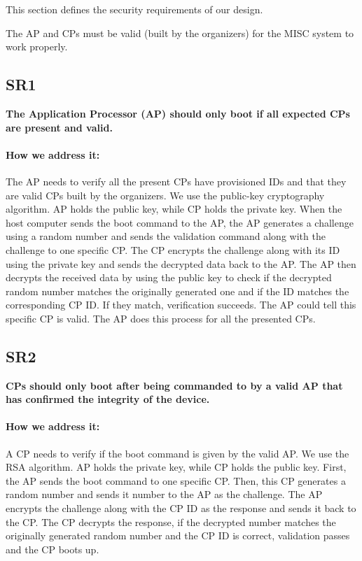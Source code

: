 \documentclass[11pt,oneside,onecolumn,letterpaper]{article}
\newcounter{alg}
\begin{document}
	This section defines the security requirements of our design.
	
	The AP and CPs must be valid (built by the organizers) for the MISC system to work properly.
	
	\subsection{SR1}
	\textbf{The Application Processor (AP) should only boot if all expected CPs are present and valid.}
	\paragraph{How we address it:}
	The AP needs to verify all the present CPs have provisioned IDs and that they are valid CPs built by the organizers.
	We use the public-key cryptography algorithm.
	AP holds the public key,
	while CP holds the private key.
	When the host computer sends the boot command to the AP,
	the AP generates a challenge using a random number and sends the validation command along with the challenge to one specific CP.
	The CP encrypts the challenge along with its ID using the private key and sends the decrypted data back to the AP.
	The AP then decrypts the received data by using the public key to check if the decrypted random number matches the originally generated one and if the ID matches the corresponding CP ID.
	If they match,
	verification succeeds.
	The AP could tell this specific CP is valid.
	The AP does this process for all the presented CPs.
	
	\subsection{SR2}
	\textbf{CPs should only boot after being commanded to by a valid AP that has confirmed the integrity of the device.}
	\paragraph{How we address it:}
	A CP needs to verify if the boot command is given by the valid AP.
	We use the RSA algorithm.
	AP holds the private key,
	while CP holds the public key.
	First, the AP sends the boot command to one specific CP.
	Then,
	this CP generates a random number and sends it number to the AP as the challenge.
	The AP encrypts the challenge along with the CP ID as the response and sends it back to the CP.
	The CP decrypts the response,
	if the decrypted number matches the originally generated random number and the CP ID is correct,
	validation passes and the CP boots up.
	
\end{document}
